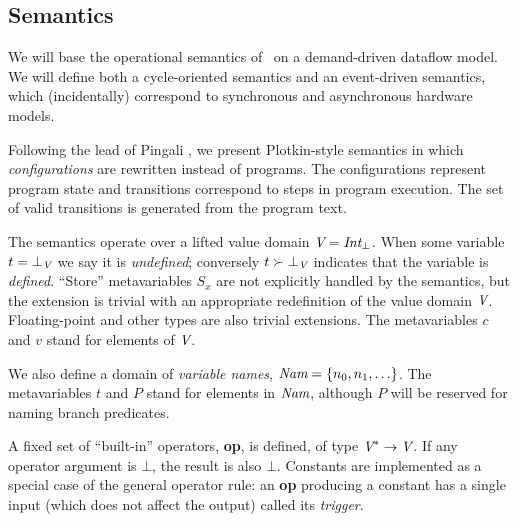 \documentclass[12pt,titlepage,twoside]{article}
\begin{document}
\subsection{Semantics}\label{sec:semantics}
We will base the operational semantics of \ssiplus\ on a demand-driven
dataflow model.  We will define both a cycle-oriented semantics and an
event-driven semantics, which (incidentally) correspond to synchronous
and asynchronous hardware models.

Following the lead of Pingali \cite{pingali90:dfg}, we present Plotkin-style
semantics \cite{plotkin81:opsem} in which \emph{configurations} are
rewritten instead of programs.  The configurations represent program
state and transitions correspond to steps in program execution.  The
set of valid transitions is generated from the program text.

The semantics operate over a lifted value domain
${\mbox{\em V}}={\mbox{\em Int}}_\bot$. When some variable
$t = \bot_{\mbox{\scriptsize\em V}}$ we say it is
\emph{undefined}; conversely $t\succ\bot_{\mbox{\scriptsize\em V}}$ indicates that the
variable is \emph{defined}.  ``Store'' metavariables $S_x$ are not
explicitly handled by the semantics, but the extension is trivial with
an appropriate redefinition of the value domain ${\mbox{\em V}}$.  Floating-point
and other types are also trivial extensions.  The
metavariables $c$ and $v$ stand for elements of ${\mbox{\em V}}$.

We also define a domain of \emph{variable names},
${\mbox{\em Nam}}=\left\{n_0,n_1,\ldots\right\}$.  The metavariables $t$ and $P$ stand for
elements in ${\mbox{\em Nam}}$, although $P$ will be reserved for naming branch predicates.

A fixed set of ``built-in'' operators, \textbf{op}, is defined,
of type ${\mbox{\em V}}^* \to {\mbox{\em V}}$.  If any operator argument is $\bot$, the
result is also $\bot$.  Constants are implemented as a special case of
the general operator rule: an \textbf{op} producing a constant has a
single input (which does not affect the output) called its \emph{trigger}.
\end{document}
